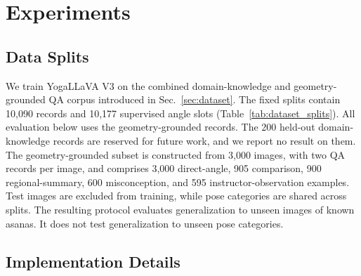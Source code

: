 \section{Experiments}
\label{sec:experimental_setup}

\subsection{Data Splits}
\label{sec:dataset_splits}

We train YogaLLaVA V3 on the combined domain-knowledge and geometry-grounded QA corpus introduced in Sec.~\ref{sec:dataset}.
The fixed splits contain 10,090 records and 10,177 supervised angle slots (Table~\ref{tab:dataset_splits}).
All evaluation below uses the geometry-grounded records.
The 200 held-out domain-knowledge records are reserved for future work, and we report no result on them.
The geometry-grounded subset is constructed from 3,000 images, with two QA records per image, and comprises 3,000 direct-angle, 905 comparison, 900 regional-summary, 600 misconception, and 595 instructor-observation examples.
Test images are excluded from training, while pose categories are shared across splits.
The resulting protocol evaluates generalization to unseen images of known asanas.
It does not test generalization to unseen pose categories.

\begin{table}[t]
    \centering
    \caption{Composition of the instruction-tuning corpus.}
    \label{tab:dataset_splits}
\end{table}

\subsection{Implementation Details}
\label{sec:implementation_details}

